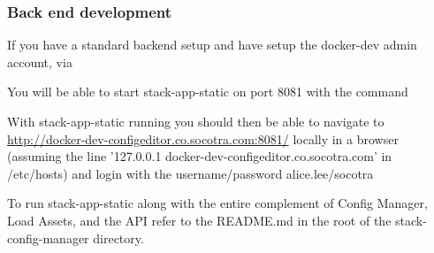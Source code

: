 \hypertarget{back-end-development}{%
\subsubsection{Back end development}\label{back-end-development}}

If you have a standard backend setup and have setup the docker-dev admin
account, via

\begin{Shaded}
\begin{Highlighting}[]
\end{Highlighting}
\end{Shaded}

You will be able to start stack-app-static on port 8081 with the command

\begin{Shaded}
\begin{Highlighting}[]
\end{Highlighting}
\end{Shaded}

With stack-app-static running you should then be able to navigate to
\href{http://docker-dev-configeditor.co.socotra.com:8081/}{http://docker-dev-configeditor.co.socotra.com:8081/}
locally in a browser (assuming the line '127.0.0.1
docker-dev-configeditor.co.socotra.com' in /etc/hosts) and login with
the username/password alice.lee/socotra

To run stack-app-static along with the entire complement of Config
Manager, Load Assets, and the API refer to the README.md in the root of
the stack-config-manager directory.
